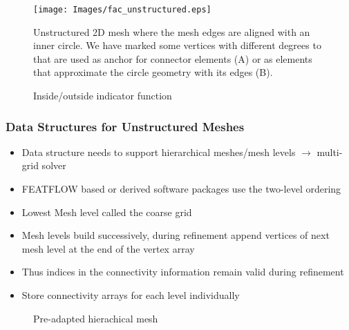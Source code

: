 \begin{frame}
\begin{figure}[h!]
\begin{center}
\texttt{[image: Images/fac\_unstructured.eps]}
\end{center}
\caption{Unstructured 2D mesh where the mesh edges are aligned with an inner circle. We have marked some vertices with different 
degrees to that are used as anchor for connector elements (A) or as elements that approximate the circle geometry with its edges (B).}
\label{fig:unstructured-fac}
\end{figure}
\end{frame}

\begin{frame}
\begin{figure}[h!]
  \centering
  \caption{Inside/outside indicator function}
  \label{fig:camaro-mesh}
\end{figure}
\end{frame}

\begin{frame}
\frametitle{Data Structures for Unstructured Meshes}
\begin{itemize}
\item Data structure needs to support hierarchical meshes/mesh levels $\rightarrow$ multi-grid solver
\item FEATFLOW based or derived software packages use the two-level ordering
\item Lowest Mesh level called the coarse grid
\item Mesh levels build successively, during refinement append vertices of next mesh level at the end of the vertex array
\item Thus indices in the connectivity information remain valid during refinement
\item Store connectivity arrays for each level individually
\end{itemize}
\end{frame}

\begin{frame}
\begin{figure}[h!]
\centering
{}
\hspace{1.0cm}
\caption{Pre-adapted hierachical mesh}
\label{fig:bench_setup}
\end{figure}
\end{frame}


